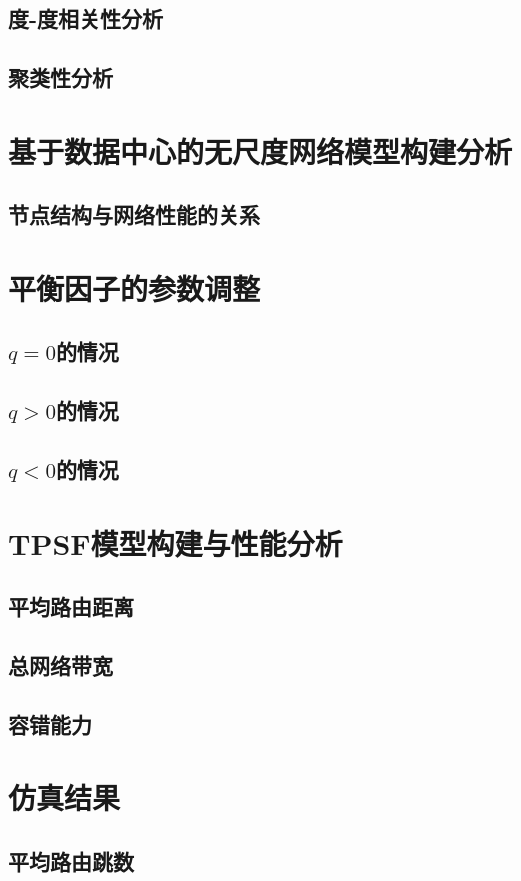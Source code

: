 \documentclass[master]{njuthesis}
\begin{document}
\subsection{度-度相关性分析}
\Blindtext
\subsection{聚类性分析}
\Blindtext
\section{基于数据中心的无尺度网络模型构建分析}
\blindtext
\subsection{节点结构与网络性能的关系}
\Blindtext
\section{平衡因子的参数调整}
\blindtext
\subsection{$q=0$的情况}
\Blindtext
\subsection{$q>0$的情况}
\Blindtext
\subsection{$q<0$的情况}
\Blindtext
\section{TPSF模型构建与性能分析}
\blindtext
\subsection{平均路由距离}
\Blindtext
\subsection{总网络带宽}
\Blindtext
\subsection{容错能力}
\Blindtext
\section{仿真结果}
\subsection{平均路由跳数}
\Blindtext
\end{document}
